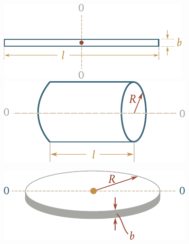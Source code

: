 \begin{figure}[t]
	\begin{minipage}[t]{0.5\linewidth}
		\begin{center}
			\includegraphics[scale=0.95]{figures/ch_05/fig_5_13.pdf}
			\caption[]{}
			\label{fig:5_13}
		\end{center}
	\end{minipage}
	\hspace{-0.05cm}
	\begin{minipage}[t]{0.5\linewidth}
		\begin{center}
			\includegraphics[scale=0.9]{figures/ch_05/fig_5_14.pdf}
			\caption[]{}
			\label{fig:5_14}
		\end{center}
	\end{minipage}
\end{figure}

\begin{figure}[t]
	\begin{center}
		\includegraphics[scale=0.95]{figures/ch_05/fig_5_15.pdf}
		\caption[]{}
		\label{fig:5_15}
	\end{center}
	\vspace{-1.0cm}
\end{figure}

